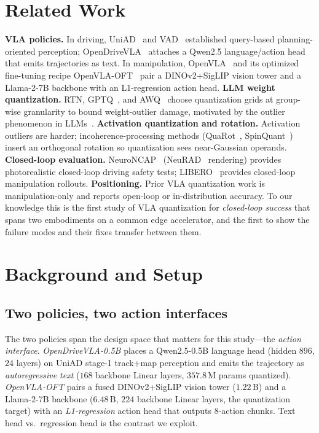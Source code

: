 \documentclass[conference]{IEEEtran}
\begin{document}
\section{Related Work}
\textbf{VLA policies.} In driving, UniAD~\cite{uniad} and VAD~\cite{vad} established query-based
planning-oriented perception; OpenDriveVLA~\cite{opendrivevla} attaches a Qwen2.5 language/action head
that emits trajectories as text. In manipulation, OpenVLA~\cite{openvla} and its optimized fine-tuning
recipe OpenVLA-OFT~\cite{oft} pair a DINOv2+SigLIP vision tower and a Llama-2-7B backbone with an
L1-regression action head. \textbf{LLM weight quantization.} RTN, GPTQ~\cite{gptq}, and AWQ~\cite{awq}
choose quantization grids at group-wise granularity to bound weight-outlier damage, motivated by the
outlier phenomenon in LLMs~\cite{llmint8,smoothquant,massiveact}. \textbf{Activation quantization and
rotation.} Activation outliers are harder; incoherence-processing methods (QuaRot~\cite{quarot},
SpinQuant~\cite{spinquant}) insert an orthogonal rotation so quantization sees near-Gaussian operands.
\textbf{Closed-loop evaluation.} NeuroNCAP~\cite{neuroncap} (NeuRAD~\cite{neurad} rendering) provides
photorealistic closed-loop driving safety tests; LIBERO~\cite{libero} provides closed-loop
manipulation rollouts. \textbf{Positioning.} Prior VLA quantization work is manipulation-only and
reports open-loop or in-distribution accuracy. To our knowledge this is the first study of VLA
quantization for \emph{closed-loop success} that spans two embodiments on a common edge accelerator,
and the first to show the failure modes and their fixes transfer between them.

\section{Background and Setup}
\subsection{Two policies, two action interfaces}
The two policies span the design space that matters for this study---the \emph{action interface}.
\emph{OpenDriveVLA-0.5B} places a Qwen2.5-0.5B language head (hidden $896$, $24$ layers) on UniAD
stage-1 track+map perception and emits the trajectory as \emph{autoregressive text} ($168$ backbone
Linear layers, $357.8$\,M params quantized). \emph{OpenVLA-OFT} pairs a fused DINOv2+SigLIP vision
tower ($1.22$\,B) and a Llama-2-7B backbone ($6.48$\,B, $224$ backbone Linear layers, the quantization
target) with an \emph{L1-regression} action head that outputs $8$-action chunks. Text head vs.\
regression head is the contrast we exploit.
\end{document}
